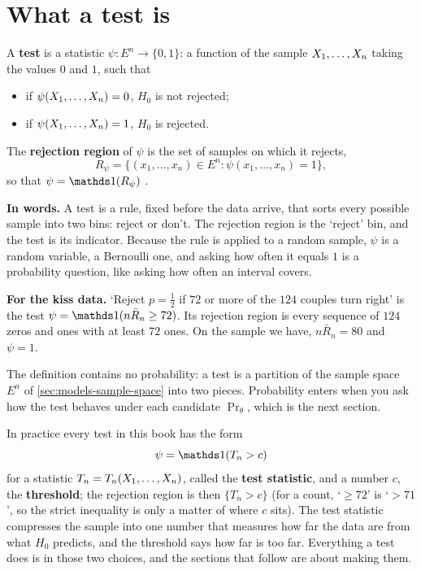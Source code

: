 \section{What a test is}
\label{sec:tests-definition}

\begin{definition}
\label{def:test}
A \textbf{test} is a statistic $\psi: E^n \to \{0, 1\}$: a function of the sample $X_1, \ldots, X_n$ taking the values $0$ and $1$, such that
\begin{itemize}[nosep]
\item if $\psi(X_1, \ldots, X_n) = 0$, $H_0$ is not rejected;
\item if $\psi(X_1, \ldots, X_n) = 1$, $H_0$ is rejected.
\end{itemize}
The \textbf{rejection region} of $\psi$ is the set of samples on which it rejects,
\[
R_\psi = \{ (x_1, \ldots, x_n) \in E^n : \psi(x_1, \ldots, x_n) = 1 \},
\]
so that $\psi = \ind(R_\psi)$ .
\end{definition}

\begin{inwords}
\textbf{In words.} A test is a rule, fixed before the data arrive, that sorts every possible sample into two bins: reject or don't. The rejection region is the `reject' bin, and the test is its indicator. Because the rule is applied to a random sample, $\psi$ is a random variable, a Bernoulli one, and asking how often it equals $1$ is a probability question, like asking how often an interval covers.
\par\smallskip
\textbf{For the kiss data.} `Reject $p = \frac12$ if $72$ or more of the $124$ couples turn right' is the test $\psi = \ind(n\bar{R}_n \geq 72)$. Its rejection region is every sequence of $124$ zeros and ones with at least $72$ ones. On the sample we have, $n\bar{R}_n = 80$ and $\psi = 1$.
\end{inwords}

The definition contains no probability: a test is a partition of the sample space $E^n$ of \cref{sec:models-sample-space} into two pieces.
Probability enters when you ask how the test behaves under each candidate $\Pr_\theta$, which is the next section.

In practice every test in this book has the form
\[
\psi = \ind( T_n > c )
\]
for a statistic $T_n = T_n(X_1, \ldots, X_n)$, called the \textbf{test statistic}, and a number $c$, the \textbf{threshold}; the rejection region is then $\{T_n > c\}$ (for a count, `$\geq 72$' is `$> 71$', so the strict inequality is only a matter of where $c$ sits).
The test statistic compresses the sample into one number that measures how far the data are from what $H_0$ predicts, and the threshold says how far is too far.
Everything a test does is in those two choices, and the sections that follow are about making them.

